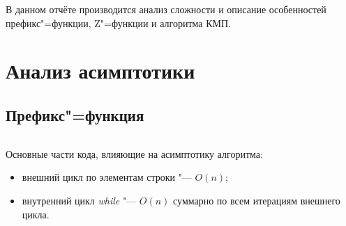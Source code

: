 \documentclass[otchet]{../SCWorks}
\begin{document}

\date{2026}

\maketitle

\secNumbering

\tableofcontents




\intro
В данном отчёте производится анализ сложности и описание особенностей префикс"=функции, Z"=функции и алгоритма КМП.

\section{Анализ асимптотики}

\subsection{Префикс"=функция}
\small
\inputminted[breaklines]{cpp}{./prefix_function.cpp}
\normalsize

Основные части кода, влияющие на асимптотику алгоритма:

\begin{itemize}
	\item внешний цикл по элементам строки "--- $O(n)$;
	\item внутренний цикл \textit{while} "--- $O(n)$ суммарно по всем итерациям внешнего цикла.
\end{itemize}
\end{document}
